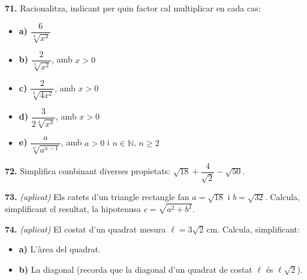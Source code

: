 \documentclass[13pt,a4paper]{extarticle}
\begin{document}
\par\noindent\begin{minipage}{\linewidth}
\textbf{71.} Racionalitza, indicant per quin factor cal multiplicar en cada cas:\par

\begin{itemize}[leftmargin=0pt,itemsep=3pt,topsep=3pt,parsep=0pt,label={}]
\item \textbf{a)} $\dfrac{6}{\sqrt[4]{x^3}}$
\item \textbf{b)} $\dfrac{2}{\sqrt[5]{x^2}}$, amb $x>0$
\item \textbf{c)} $\dfrac{2}{\sqrt[3]{4x^2}}$, amb $x>0$
\item \textbf{d)} $\dfrac{3}{2\sqrt[4]{x^3}}$, amb $x>0$
\item \textbf{e)} $\dfrac{a}{\sqrt[n]{a^{n-1}}}$, amb $a>0$ i $n\in\mathbb{N}$, $n\geq 2$
\end{itemize}
\end{minipage}\par\vspace{1.6mm}
\par\noindent\begin{minipage}{\linewidth}
\textbf{72.} Simplifica combinant diverses propietats: $\sqrt{18}+\dfrac{4}{\sqrt2}-\sqrt{50}$.\par
\end{minipage}\par\vspace{1.6mm}
\par\noindent\begin{minipage}{\linewidth}
\textbf{73.} \emph{(aplicat)} Els catets d'un triangle rectangle fan $a=\sqrt{18}$ i $b=\sqrt{32}$. Calcula, simplificant el resultat, la hipotenusa $c=\sqrt{a^2+b^2}$.\par
\end{minipage}\par\vspace{1.6mm}
\par\noindent\begin{minipage}{\linewidth}
\textbf{74.} \emph{(aplicat)} El costat d'un quadrat mesura $\ell=3\sqrt2\,\text{cm}$. Calcula, simplificant:\par

\begin{itemize}[leftmargin=0pt,itemsep=3pt,topsep=3pt,parsep=0pt,label={}]
\item \textbf{a)} L'àrea del quadrat.
\item \textbf{b)} La diagonal (recorda que la diagonal d'un quadrat de costat $\ell$ és $\ell\sqrt2$).
\end{itemize}
\end{minipage}\par\vspace{1.6mm}
\end{document}
